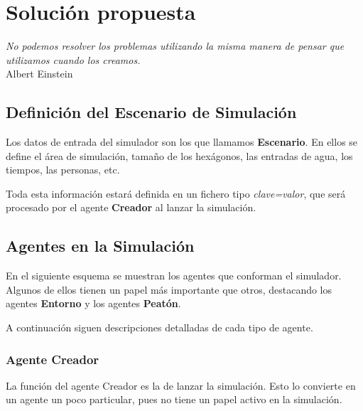 
\chapter*{Solución propuesta} \label{cap3}


\begin{flushright}
\begin{minipage}{7.85cm}
    {\em No podemos resolver los problemas utilizando la misma manera de pensar
    que utilizamos cuando los creamos.} \\ Albert Einstein
\end{minipage}
\end{flushright}

\vspace*{5mm}

\section*{Definición del Escenario de Simulación}

Los datos de entrada del simulador son los que llamamos {\bf Escenario}. En
ellos se define el área de simulación, tamaño de los hexágonos, las entradas de
agua, los tiempos, las personas, etc.

Toda esta información estará definida en un fichero tipo {\em clave=valor}, que
será procesado por el agente {\bf Creador} al lanzar la simulación.

\section*{Agentes en la Simulación}

En el siguiente esquema se muestran los agentes que conforman el simulador.
Algunos de ellos tienen un papel más importante que otros, destacando los
agentes {\bf Entorno} y los agentes {\bf Peatón}.


A continuación siguen descripciones detalladas de cada tipo de agente.

\subsection*{Agente Creador}

La función del agente Creador es la de lanzar la simulación. Esto lo convierte
en un agente un poco particular, pues no tiene un papel activo en la
simulación.

